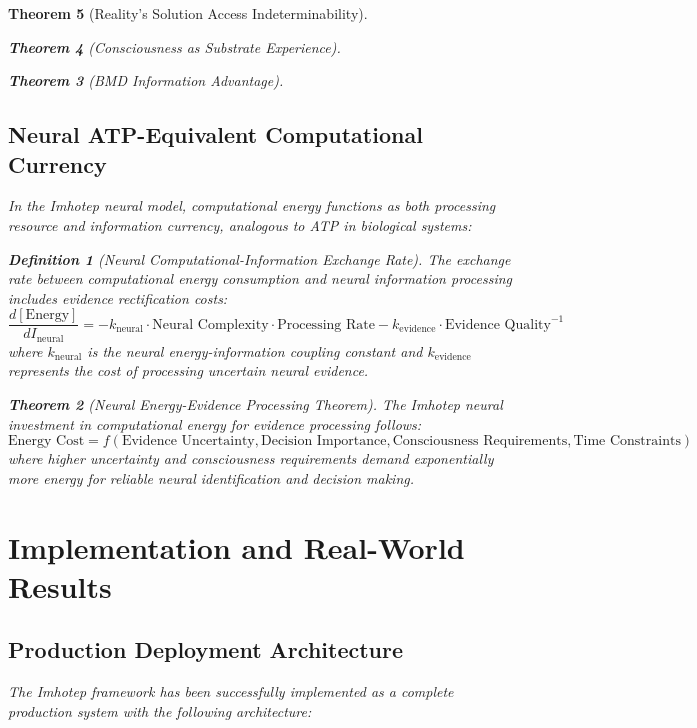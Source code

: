 \documentclass[12pt,a4paper]{article}
\newtheorem{theorem}{Theorem}[section]
\newtheorem{definition}[theorem]{Definition}
\theoremstyle{remark}
\begin{document}
\begin{theorem}[Reality's Solution Access Indeterminability]
\begin{theorem}[Consciousness as Substrate Experience]
\begin{theorem}[BMD Information Advantage]
{{{\subsection{Neural ATP-Equivalent Computational Currency}

In the Imhotep neural model, computational energy functions as both processing resource and information currency, analogous to ATP in biological systems:

\begin{definition}[Neural Computational-Information Exchange Rate]
The exchange rate between computational energy consumption and neural information processing includes evidence rectification costs:
\begin{equation}
\frac{d[\text{Energy}]}{dI_{\text{neural}}} = -k_{\text{neural}} \cdot \text{Neural Complexity} \cdot \text{Processing Rate} - k_{\text{evidence}} \cdot \text{Evidence Quality}^{-1}
\end{equation}
where $k_{\text{neural}}$ is the neural energy-information coupling constant and $k_{\text{evidence}}$ represents the cost of processing uncertain neural evidence.
\end{definition}

\begin{theorem}[Neural Energy-Evidence Processing Theorem]
The Imhotep neural investment in computational energy for evidence processing follows:
\begin{equation}
\text{Energy Cost} = f(\text{Evidence Uncertainty}, \text{Decision Importance}, \text{Consciousness Requirements}, \text{Time Constraints})
\end{equation}
where higher uncertainty and consciousness requirements demand exponentially more energy for reliable neural identification and decision making.
\end{theorem}

\section{Implementation and Real-World Results}

\subsection{Production Deployment Architecture}

The Imhotep framework has been successfully implemented as a complete production system with the following architecture:

}}}
\end{theorem}
\end{theorem}
\end{theorem}
\end{document}
